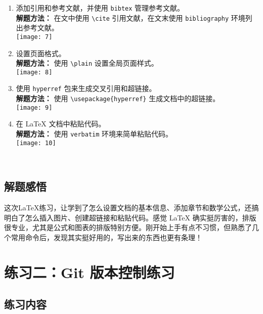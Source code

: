 \documentclass[12pt]{article}
\begin{document}
\begin{enumerate}
    \item 添加引用和参考文献，并使用 \texttt{bibtex} 管理参考文献。\\
    \textbf{解题方法：} 在文中使用 \texttt{\textbackslash cite} 引用文献，在文末使用 \texttt{bibliography} 环境列出参考文献。\\
    \texttt{[image: 7]}
    
    \item 设置页面格式。\\
    \textbf{解题方法：} 使用 \texttt{\textbackslash plain} 设置全局页面样式。\\
    \texttt{[image: 8]}
    
    \item 使用 \texttt{hyperref} 包来生成交叉引用和超链接。\\
    \textbf{解题方法：} 使用 \texttt{\textbackslash usepackage\{hyperref\}} 生成文档中的超链接。\\
    \texttt{[image: 9]}
    
    \item 在 LaTeX 文档中粘贴代码。\\
    \textbf{解题方法：} 使用 \texttt{verbatim} 环境来简单粘贴代码。\\
    \texttt{[image: 10]}

\end{enumerate}\\



\subsection*{解题感悟}
这次LaTeX练习，让学到了怎么设置文档的基本信息、添加章节和数学公式，还搞明白了怎么插入图片、创建超链接和粘贴代码。感觉 LaTeX 确实挺厉害的，排版很专业，尤其是公式和图表的排版特别方便。刚开始上手有点不习惯，但熟悉了几个常用命令后，发现其实挺好用的，写出来的东西也更有条理！

\newpage

\section*{练习二：Git 版本控制练习}

\subsection*{练习内容}
\end{document}
